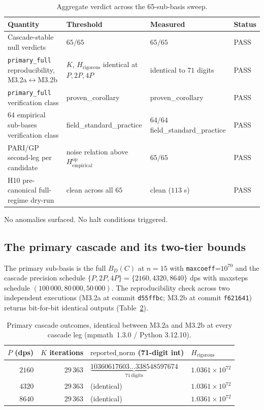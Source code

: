 \documentclass[11pt,a4paper]{article}
\newcommand{\Hrig}{H_{\mathrm{rigorous}}}
\newcommand{\Hempop}{H_{\mathrm{empirical}}^{\mathrm{op}}}
\newcommand{\BDC}{B_{D}(C)}
\newcommand{\fsp}{\textsf{field\_standard\_practice}}
\newcommand{\pc}{\textsf{proven\_corollary}}
\begin{document}
\begin{table}[h]
\centering
\caption{Aggregate verdict across the 65-sub-basis sweep.\label{tab:agg}}
\small
\begin{tabular}{p{}p{}p{}l}
\toprule
Quantity & Threshold & Measured & Status \\
\midrule
Cascade-stable null verdicts & $65/65$ & $65/65$ & PASS \\
\texttt{primary\_full} reproducibility,
  M3.2a$\leftrightarrow$M3.2b
  & $K$, $\Hrig$ identical at $P, 2P, 4P$
  & identical to $71$ digits & PASS \\
\texttt{primary\_full} verification class & \pc{} & \pc{} & PASS \\
$64$ empirical sub-bases verification class & \fsp{} & $64/64$ \fsp{} & PASS \\
PARI/GP second-leg per candidate
  & noise relation above $\Hempop$
  & $65/65$ & PASS \\
H10 pre-canonical full-regime dry-run
  & clean across all $65$
  & clean ($113$ s) & PASS \\
\bottomrule
\end{tabular}
\end{table}

No anomalies surfaced.
No halt conditions triggered.

\subsection{The primary cascade and its two-tier bounds}\label{sec:results-bounds}

The primary sub-basis is the full $\BDC$ at $n=15$ with
\texttt{maxcoeff}=$10^{70}$ and the cascade precision schedule
$\{P, 2P, 4P\} = \{2160, 4320, 8640\}$ dps with maxsteps schedule
$(100\,000, 80\,000, 50\,000)$.
The reproducibility check across two independent executions (M3.2a at commit
\texttt{d55ffbc}; M3.2b at commit \texttt{f621641}) returns bit-for-bit
identical outputs (Table~\ref{tab:cascade}).

\begin{table}[h]
\centering
\caption{Primary cascade outcomes, identical between M3.2a and M3.2b at every cascade leg
  (mpmath~1.3.0 / Python 3.12.10).\label{tab:cascade}}
\begin{tabular}{rrll}
\toprule
$P$ (dps) & $K$ iterations & $\mathrm{reported\_norm}$ (71-digit int) & $\Hrig$ \\
\midrule
$2160$  & $29\,363$ & $\underbrace{10360617603\ldots33854859767\!4}_{71\,\mathrm{digits}}$ & $1.0361\times 10^{72}$ \\
$4320$  & $29\,363$ & (identical) & $1.0361\times 10^{72}$ \\
$8640$  & $29\,363$ & (identical) & $1.0361\times 10^{72}$ \\
\bottomrule
\end{tabular}
\end{table}
\end{document}
